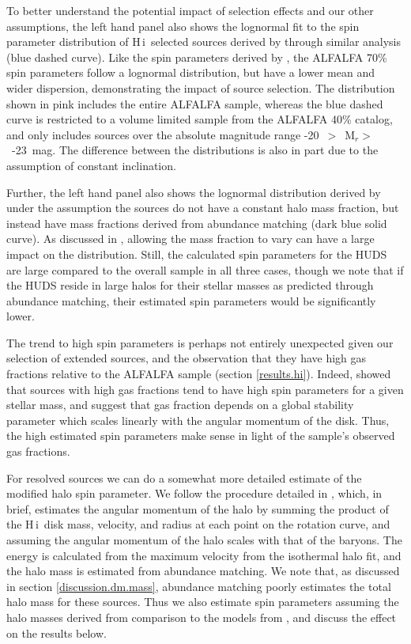 \documentclass[twocolumn]{aastex6}
\newcommand{\hi}{H{\sc\,i}}
\begin{document}
To better understand the potential impact of selection effects and our other assumptions, the left hand panel also shows the lognormal fit to the spin parameter distribution of \hi\ selected sources derived by \cite{huang12b} through similar analysis (blue dashed curve). %
Like the spin parameters derived by \cite{huang12b}, the ALFALFA 70\% spin parameters follow a lognormal distribution, but have a lower mean and wider dispersion, demonstrating the impact of source selection.  The distribution shown in pink includes the entire ALFALFA sample, whereas the blue dashed curve is restricted to a volume limited sample from the ALFALFA 40\% catalog, and only includes sources over the absolute magnitude range -20~$>$~M$_r>$~-23~mag. The difference between the distributions is also in part due to the assumption of constant inclination. 

Further, the left hand panel also shows the lognormal distribution derived by \cite{huang12b} under the assumption the sources do not have a constant halo mass fraction, but instead have mass fractions derived from abundance matching (dark blue solid curve). As discussed in \cite{huang12b}, allowing the mass fraction to vary can have a large impact on the distribution. 
Still, the calculated spin parameters for the HUDS are large compared to the overall sample in all three cases, though we note that if the HUDS reside in large halos for their stellar masses as predicted through abundance matching, their estimated spin parameters would be significantly lower.
 
The trend to high spin parameters is perhaps not entirely unexpected given our selection of extended sources,
and the observation that they have high gas fractions relative to the ALFALFA sample (section \ref{results.hi}). Indeed, \cite{huang12b} showed that sources with high gas fractions tend to have high spin parameters for a given stellar mass, and \cite{obreschkow16a} suggest that gas fraction depends on a global stability parameter which scales linearly with the angular momentum of the disk. Thus, the high estimated spin parameters make sense in light of the sample's observed gas fractions.

For resolved sources we can do a somewhat more detailed estimate of the modified halo spin parameter.  We follow the procedure detailed in \cite{hallenbeck14a}, which,  in brief, estimates the angular momentum of the halo by summing the product of the \hi\ disk mass, velocity, and radius at each point on the rotation curve, and assuming the angular momentum of the halo scales with that of the baryons. The energy is calculated from the maximum velocity from the isothermal halo fit, and the halo mass is estimated from abundance matching. We note that, as discussed in section \ref{discussion.dm.mass}, abundance matching poorly estimates the total halo mass for these sources. Thus we also estimate spin parameters assuming the halo masses derived from comparison to the models from \cite{dicintio16a}, and discuss the effect on the results below. 
\end{document}
